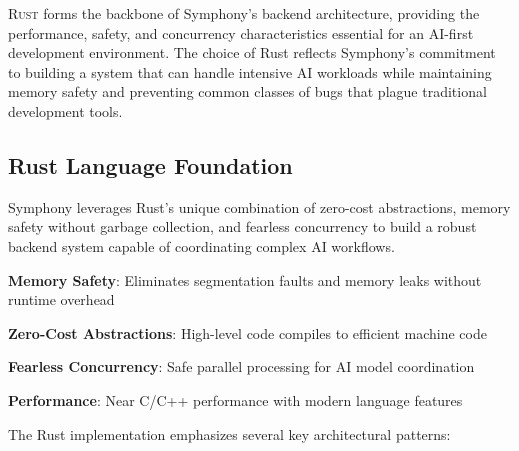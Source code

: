 
\lettrine{R}{ust} forms the backbone of Symphony's backend architecture, providing the performance, safety, and concurrency characteristics essential for an AI-first development environment. The choice of Rust reflects Symphony's commitment to building a system that can handle intensive AI workloads while maintaining memory safety and preventing common classes of bugs that plague traditional development tools.

\subsection*{Rust Language Foundation}

Symphony leverages Rust's unique combination of zero-cost abstractions, memory safety without garbage collection, and fearless concurrency to build a robust backend system capable of coordinating complex AI workflows.

\begin{infobox}[title=Rust's Core Advantages for Symphony]
\begin{compactlist}
    \item \textbf{Memory Safety}: Eliminates segmentation faults and memory leaks without runtime overhead
    \item \textbf{Zero-Cost Abstractions}: High-level code compiles to efficient machine code
    \item \textbf{Fearless Concurrency}: Safe parallel processing for AI model coordination
    \item \textbf{Performance}: Near C/C++ performance with modern language features
\end{compactlist}
\end{infobox}

The Rust implementation emphasizes several key architectural patterns:

